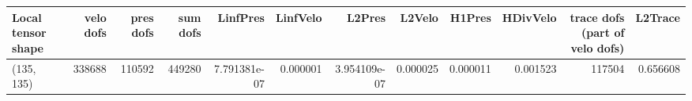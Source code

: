 \begin{tabular}{lrrrrrrrrrrr}
\toprule
Local tensor shape &  velo dofs &  pres dofs &  sum dofs &     LinfPres &  LinfVelo &       L2Pres &   L2Velo &   H1Pres &  HDivVelo &  trace dofs (part of velo dofs) &  L2Trace \\
\midrule
        (135, 135) &     338688 &     110592 &    449280 & 7.791381e-07 &  0.000001 & 3.954109e-07 & 0.000025 & 0.000011 &  0.001523 &                          117504 & 0.656608 \\
\bottomrule
\end{tabular}
